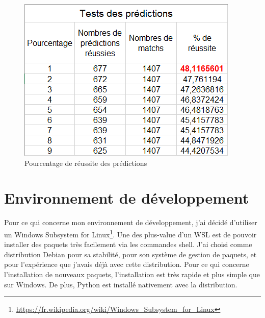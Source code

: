 \documentclass[a4paper,14pt]{extarticle}
\begin{document}
{\begin{figure}[htp]
    \centering
    \includegraphics{../img/pourcentReussitePredictionV2.png}
    \caption{Pourcentage de réussite des prédictions}
    \label{fig:pourcentReussite}
\end{figure}

\newpage

\section{Environnement de développement}

Pour ce qui concerne mon environnement de développement, j'ai décidé d'utiliser un Windows Subsystem for Linux\footnote{\url{https://fr.wikipedia.org/wiki/Windows_Subsystem_for_Linux}}. Une des plus-value d'un WSL est de pouvoir installer des paquets très facilement via les commandes shell. J'ai choisi comme distribution Debian pour sa stabilité, pour son système de gestion de paquets, et pour l'expérience que j'avais déjà avec cette distribution.  Pour ce qui concerne l'installation de nouveaux paquets, l'installation est très rapide et plus simple que sur Windows. De plus, Python est installé nativement avec la distribution.

}
\end{document}
